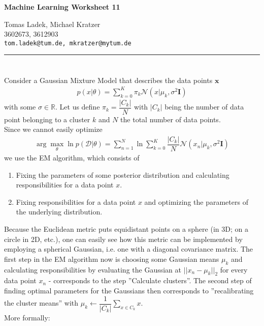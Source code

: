 \documentclass[11pt]{article}
\makeatletter
\newcommand{\exercise}{\section{}}
\newcommand{\hwhead}[4]{
\begin{center}
\sffamily\large\bfseries Machine Learning Worksheet #1
\vspace{2mm}
\normalfont

#2\\
#3\\
\texttt{#4}
\end{center}
\vspace{6mm} \hrule \vspace{4mm}
}
\newcommand{\names}{Tomas Ladek, Michael Kratzer} %
\newcommand{\imats}{3602673, 3612903} %
\newcommand{\emails}{tom.ladek@tum.de, mkratzer@mytum.de} %
\makeatother
\begin{document}
\hwhead{11}{\names}{\imats}{\emails}


\exercise
Consider a Gaussian Mixture Model that describes the data points $\boldsymbol{x}$
\begin{align*}
	p (x | \theta) = \sum_{k = 0}^{K} \pi_k \mathcal N(x | \mu_k, \sigma^2 \boldsymbol{I})
\end{align*}
with some $\sigma \in \mathbb{R}$. Let us define $\pi_k = \dfrac{|C_k|}{N}$ with $|C_k|$ being the number of data point belonging to a cluster $k$ and $N$ the total number of data points.\\

\noindent Since we cannot easily optimize
\begin{align*}
	\arg \max_{\theta} \ln p(\mathcal{D}|\theta) = \sum_{n=1}^{N} \ln \sum_{k=0}^{K} \dfrac{|C_k|}{N} \mathcal{N}(x_n | \mu_k, \sigma^2 \boldsymbol{I})
\end{align*}
we use the EM algorithm, which consists of
\begin{enumerate}
	\item Fixing the parameters of some posterior distribution and calculating responsibilities for a data point $x$.
	\item Fixing responsibilities for a data point $x$ and optimizing the parameters of the underlying distribution.
\end{enumerate}
Because the Euclidean metric puts equidistant points on a sphere (in 3D; on a circle in 2D, etc.), one can easily see how this metric can be implemented by employing a spherical Gaussian, i.e. one with a diagonal covariance matrix. The first step in the EM algorithm now is choosing some Gaussian means $\mu_k$ and calculating responsibilities by evaluating the Gaussian at $||x_n - \mu_k||_2$ for every data point $x_n$ - corresponds to the step ''Calculate clusters''. The second step of finding optimal parameters for the Gaussians then corresponds to ''recalibrating the cluster means'' with $\mu_k \leftarrow \dfrac{1}{|C_k|} \sum_{x \in C_k} x$.\\

\noindent More formally:
\end{document}

